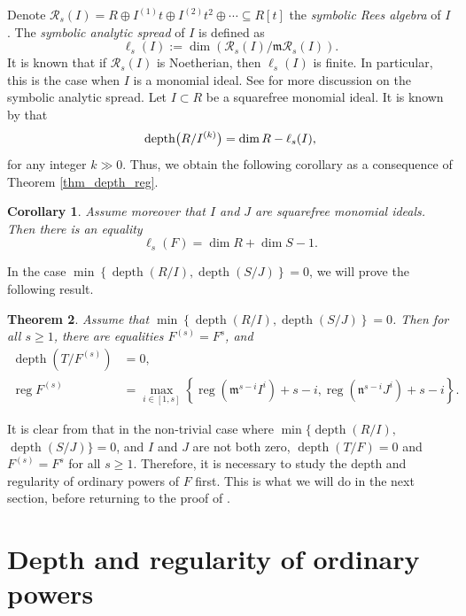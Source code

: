 \documentclass{amsart}
\DeclareMathOperator{\depth}{depth}
\DeclareMathOperator{\reg}{reg}
\newcommand{\mm}{\mathfrak{m}}
\newcommand{\nn}{\mathfrak{n}}
\theoremstyle{plain}
\newtheorem{thm}{Theorem}[section]
\newtheorem{cor}[thm]{Corollary}
\theoremstyle{definition}
\numberwithin{equation}{section}
\newcommand{\Rcc}{\mathcal{R}}
\begin{document}
Denote $\Rcc_s(I)=R\oplus I^{(1)}t \oplus I^{(2)}t^2 \oplus \cdots \subseteq R[t]$ the \emph{symbolic Rees algebra} of $I$. The \emph{symbolic analytic spread} of $I$ is defined as
\[
\ell_s(I):= \dim(\Rcc_s(I)/\mm \Rcc_s(I)).
\]
It is known that if $\Rcc_s(I)$ is Noetherian, then $\ell_s(I)$ is finite. In particular, this is the case when $I$ is a monomial ideal. See \cite{DM21} for more discussion on the symbolic analytic spread. Let $I\subset R$ be a squarefree monomial ideal. It is known by \cite[Theorem 2.4]{HKTT} that $${\rm depth}\big(R/I^{(k)}\big)=\dim R-\ell_s(I),$$for any integer $k\gg 0$. Thus, we obtain the following corollary as a consequence of Theorem \ref{thm_depth_reg}.

\begin{cor}
Assume moreover that $I$ and $J$ are squarefree monomial ideals. Then there is an equality 
$$
\ell_s(F)=\dim R+ \dim S-1.
$$
\end{cor}

In the case $\min \left\{\depth(R/I),\depth(S/J)\right\}=0$, we will prove the following result.
\begin{thm}
\label{thm_depth_zerodepthcase}
Assume that $\min \left\{\depth(R/I),\depth(S/J)\right\}=0$. Then for all $s\ge 1$,  there are equalities $F^{(s)}=F^s$, and
\begin{align*}
\depth(T/F^{(s)})&=0,\\
\reg F^{(s)} &= \max \limits_{i\in [1,s]} \left\{\reg(\mm^{s-i}I^i)+s-i, \reg(\nn^{s-i}J^i)+s-i\right\}.
\end{align*}
\end{thm}
It is clear from  that in the non-trivial case where $\min \{\depth(R/I),$ $\depth(S/J)\}=0$, and $I$ and $J$ are not both zero, $\depth(T/F)=0$ and $F^{(s)}=F^s$ for all $s\ge 1$. Therefore, it is necessary to study the depth and regularity of ordinary powers of $F$ first. This is what we will do in the next section, before returning to the proof of .


\section{Depth and regularity of ordinary powers}
\label{sect_ordinarypowers}
\end{document}
